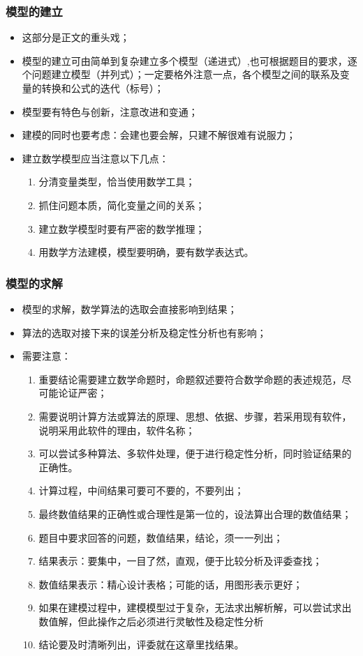 \documentclass[openany]{progbookcn}
\begin{document}
\subsubsection{模型的建立}
\begin{itemize}
    \item 这部分是正文的重头戏；
    \item 模型的建立可由简单到复杂建立多个模型（递进式）,也可根据题目的要求，逐个问题建立模型（并列式）；一定要格外注意一点，各个模型之间的联系及变量的转换和公式的迭代（标号）；
    \item 模型要有特色与创新，注意改进和变通；
    \item 建模的同时也要考虑：会建也要会解，只建不解很难有说服力；
    \item 建立数学模型应当注意以下几点：
    \begin{enumerate}[itemindent=1em]
        \item 分清变量类型，恰当使用数学工具；
        \item 抓住问题本质，简化变量之间的关系；
        \item 建立数学模型时要有严密的数学推理；
        \item 用数学方法建模，模型要明确，要有数学表达式。
    \end{enumerate}
\end{itemize}
\subsubsection{模型的求解}
\begin{itemize}
    \item 模型的求解，数学算法的选取会直接影响到结果；
    \item 算法的选取对接下来的误差分析及稳定性分析也有影响；
    \item 需要注意：
    \begin{enumerate}[itemindent=1em]
        \item 重要结论需要建立数学命题时，命题叙述要符合数学命题的表述规范，尽可能论证严密；
        \item 需要说明计算方法或算法的原理、思想、依据、步骤，若采用现有软件，说明采用此软件的理由，软件名称；
        \item 可以尝试多种算法、多软件处理，便于进行稳定性分析，同时验证结果的正确性。
        \item 计算过程，中间结果可要可不要的，不要列出；
        \item 最终数值结果的正确性或合理性是第一位的，设法算出合理的数值结果；
        \item 题目中要求回答的问题，数值结果，结论，须一一列出；
        \item 结果表示：要集中，一目了然，直观，便于比较分析及评委查找；
        \item 数值结果表示：精心设计表格；可能的话，用图形表示更好；
        \item 如果在建模过程中，建模模型过于复杂，无法求出解析解，可以尝试求出数值解，但此操作之后必须进行灵敏性及稳定性分析
        \item 结论要及时清晰列出，评委就在这章里找结果。
    \end{enumerate}
\end{itemize}
\end{document}
